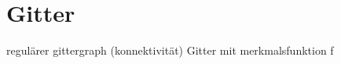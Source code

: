 \section{Gitter}
\label{gitter}

regulärer gittergraph (konnektivität)
Gitter mit merkmalsfunktion f
